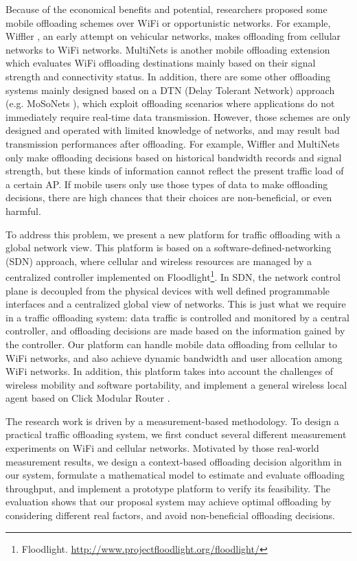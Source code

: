 \documentclass[english]{tktltiki}
\begin{document}
Because of the economical benefits and potential, researchers proposed some mobile offloading schemes over WiFi or opportunistic networks. For example, Wiffler \cite{bmv10}, an early attempt on vehicular networks, makes offloading from cellular networks to WiFi networks. MultiNets \cite{nnh+14} is another mobile offloading extension which evaluates WiFi offloading destinations mainly based on their signal strength and connectivity status. In addition, there are some other offloading systems mainly designed based on a DTN (Delay Tolerant Network) approach (e.g. MoSoNets \cite{hhk+12}), which exploit offloading scenarios where applications do not immediately require real-time data transmission. However, those schemes are only designed and operated with limited knowledge of networks, and may result bad transmission performances after offloading. For example, Wiffler and MultiNets only make offloading decisions based on historical bandwidth records and signal strength, but these kinds of information cannot reflect the present traffic load of a certain AP. If mobile users only use those types of data to make offloading decisions, there are high chances that their choices are non-beneficial, or even harmful.

To address this problem, we present a new platform for traffic offloading with a global network view. This platform is based on a software-defined-networking (SDN) approach, where cellular and wireless resources are managed by a centralized controller implemented on Floodlight\footnote{Floodlight. \url{http://www.projectfloodlight.org/floodlight/}}. In SDN, the network control plane is decoupled from the physical devices with well defined programmable interfaces and a centralized global view of networks. This is just what we require in a traffic offloading system: data traffic is controlled and monitored by a central controller, and offloading decisions are made based on the information gained by the controller. Our platform can handle mobile data offloading from cellular to WiFi networks, and also achieve dynamic bandwidth and user allocation among WiFi networks. In addition, this platform takes into account the challenges of wireless mobility and software portability, and implement a general wireless local agent based on Click Modular Router \cite{click}.

The research work is driven by a measurement-based methodology. To design a practical traffic offloading system, we first conduct several different measurement experiments on WiFi and cellular networks. Motivated by those real-world measurement results, we design a context-based offloading decision algorithm in our system, formulate a mathematical model to estimate and evaluate offloading throughput, and implement a prototype platform to verify its feasibility. The evaluation shows that our proposal system may achieve optimal offloading by considering different real factors, and avoid non-beneficial offloading decisions.
\end{document}
